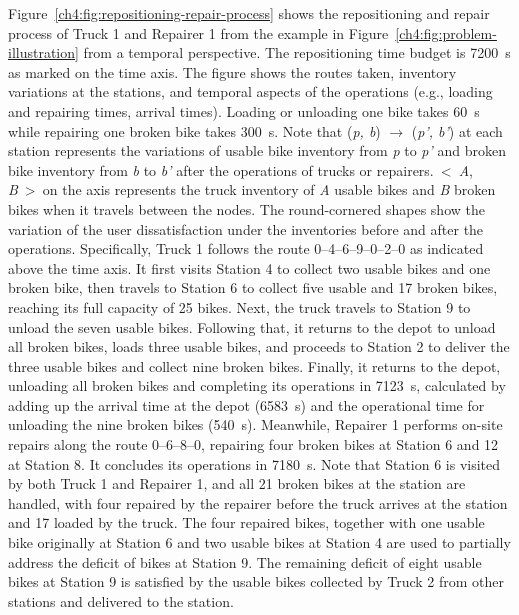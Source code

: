 Figure~\ref{ch4:fig:repositioning-repair-process} shows the repositioning and repair process of Truck 1 and Repairer 1 from the example in
Figure~\ref{ch4:fig:problem-illustration} from a temporal perspective. The repositioning time budget is 7200~s as marked on the time
axis. The figure shows the routes taken, inventory variations at the stations, and temporal aspects
of the operations (e.g., loading and repairing times, arrival times). Loading or unloading one bike
takes 60~s while repairing one broken bike takes 300~s. Note that (\emph{p, b}) \ensuremath{\rightarrow} (\emph{p', b'}) at
each station represents the variations of usable bike inventory from \emph{p} to \emph{p'} and
broken bike inventory from \emph{b} to \emph{b'} after the operations of trucks or
repairers.~\textless~\emph{A}, \emph{B}~\textgreater~on the axis represents the truck inventory of
\emph{A} usable bikes and \emph{B} broken bikes when it travels between the nodes. The
round-cornered shapes show the variation of the user dissatisfaction under the inventories before
and after the operations. Specifically, Truck 1 follows the route 0--4--6--9--0--2--0 as indicated
above the time axis. It first visits Station 4 to collect two usable bikes and one broken bike, then
travels to Station 6 to collect five usable and 17 broken bikes, reaching its full capacity of 25
bikes. Next, the truck travels to Station 9 to unload the seven usable bikes. Following that, it
returns to the depot to unload all broken bikes, loads three usable bikes, and proceeds to Station 2
to deliver the three usable bikes and collect nine broken bikes. Finally, it returns to the depot,
unloading all broken bikes and completing its operations in 7123~s, calculated by adding up the
arrival time at the depot (6583~s) and the operational time for unloading the nine broken bikes
(540~s). Meanwhile, Repairer 1 performs on-site repairs along the route 0--6--8--0, repairing four
broken bikes at Station 6 and 12 at Station 8. It concludes its operations in 7180~s. Note that
Station 6 is visited by both Truck 1 and Repairer 1, and all 21 broken bikes at the station are
handled, with four repaired by the repairer before the truck arrives at the station and 17 loaded by
the truck. The four repaired bikes, together with one usable bike originally at Station 6 and two
usable bikes at Station 4 are used to partially address the deficit of bikes at Station 9. The
remaining deficit of eight usable bikes at Station 9 is satisfied by the usable bikes collected by
Truck 2 from other stations and delivered to the station.

